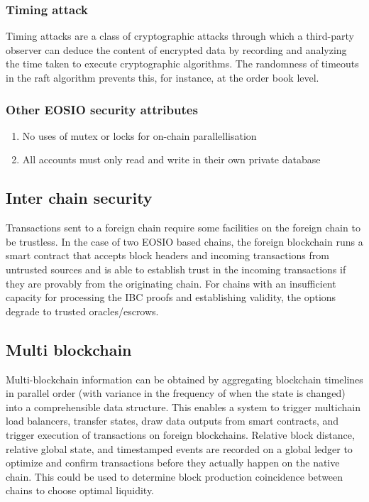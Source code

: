 \documentclass[]{article}
\begin{document}
{\subsubsection{Timing attack}
Timing attacks are a class of cryptographic attacks through which a third-party observer can deduce the content of encrypted data 
by recording and analyzing the time taken to execute cryptographic algorithms.
The randomness of timeouts in the raft algorithm prevents this, for instance, at the order book level.

\subsubsection{Other EOSIO security attributes}
\begin{enumerate}
	\item No uses of mutex or locks for on-chain parallellisation
	\item All accounts must only read and write in their own private database
\end{enumerate}

\subsection{Inter chain security}

Transactions sent to a foreign chain require some facilities on the foreign chain to be trustless. 
In the case of two EOSIO based chains, the foreign blockchain runs a smart contract that accepts block headers and incoming transactions from untrusted sources and is able to establish trust in the incoming transactions if they are provably from the originating chain. 
For chains with an insufficient capacity for processing the IBC proofs and establishing validity, the options degrade to trusted oracles/escrows.


\subsection{Multi blockchain}
Multi-blockchain information can be obtained by aggregating blockchain timelines in parallel order 
(with variance in the frequency of when the state is changed) into a comprehensible data structure.
This enables a system to trigger multichain load balancers, transfer states, draw data outputs from smart contracts, 
and trigger execution of transactions on foreign blockchains. 
Relative block distance, relative global state, and timestamped events are recorded on a global ledger to optimize and confirm transactions 
before they actually happen on the native chain.
This could be used to determine block production coincidence between chains to choose optimal liquidity.\cite{20}

}
\end{document}
